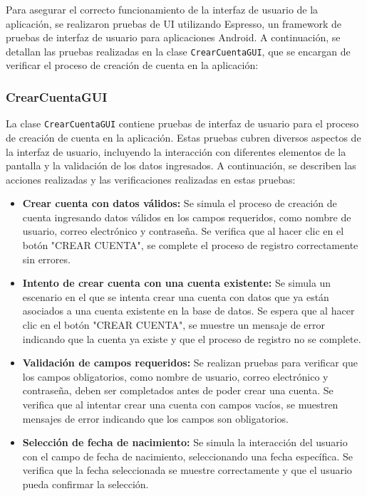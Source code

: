 \documentclass{article}
\begin{document}
Para asegurar el correcto funcionamiento de la interfaz de usuario de la aplicación, se realizaron pruebas de UI utilizando Espresso, un framework de pruebas de interfaz de usuario para aplicaciones Android. A continuación, se detallan las pruebas realizadas en la clase \texttt{CrearCuentaGUI}, que se encargan de verificar el proceso de creación de cuenta en la aplicación:

\subsubsection{CrearCuentaGUI}

La clase \texttt{CrearCuentaGUI} contiene pruebas de interfaz de usuario para el proceso de creación de cuenta en la aplicación. Estas pruebas cubren diversos aspectos de la interfaz de usuario, incluyendo la interacción con diferentes elementos de la pantalla y la validación de los datos ingresados. A continuación, se describen las acciones realizadas y las verificaciones realizadas en estas pruebas:

\begin{itemize}
    \item \textbf{Crear cuenta con datos válidos:} Se simula el proceso de creación de cuenta ingresando datos válidos en los campos requeridos, como nombre de usuario, correo electrónico y contraseña. Se verifica que al hacer clic en el botón "CREAR CUENTA", se complete el proceso de registro correctamente sin errores.
    
    \item \textbf{Intento de crear cuenta con una cuenta existente:} Se simula un escenario en el que se intenta crear una cuenta con datos que ya están asociados a una cuenta existente en la base de datos. Se espera que al hacer clic en el botón "CREAR CUENTA", se muestre un mensaje de error indicando que la cuenta ya existe y que el proceso de registro no se complete.
    
    \item \textbf{Validación de campos requeridos:} Se realizan pruebas para verificar que los campos obligatorios, como nombre de usuario, correo electrónico y contraseña, deben ser completados antes de poder crear una cuenta. Se verifica que al intentar crear una cuenta con campos vacíos, se muestren mensajes de error indicando que los campos son obligatorios.
    
    \item \textbf{Selección de fecha de nacimiento:} Se simula la interacción del usuario con el campo de fecha de nacimiento, seleccionando una fecha específica. Se verifica que la fecha seleccionada se muestre correctamente y que el usuario pueda confirmar la selección.
\end{itemize}
\end{document}
